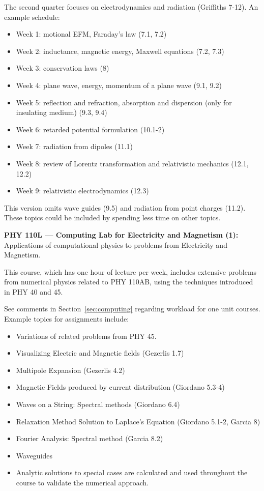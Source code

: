 \documentclass[12pt]{article}
\begin{document}
The second quarter focuses on electrodynamics and radiation (Griffiths 7-12).
An example schedule:
\begin{itemize}
\item Week 1: motional EFM, Faraday's law (7.1, 7.2)
\item Week 2: inductance, magnetic energy, Maxwell equations (7.2, 7.3)
\item Week 3: conservation laws (8)
\item Week 4: plane wave, energy, momentum of a plane wave (9.1, 9.2)
\item Week 5: reflection and refraction, absorption and dispersion (only for insulating medium) (9.3, 9.4)
\item Week 6: retarded potential formulation (10.1-2)
\item Week 7: radiation from dipoles (11.1)
\item Week 8: review of Lorentz transformation and relativistic mechanics (12.1, 12.2)
\item Week 9: relativistic electrodynamics (12.3)
\end{itemize}
This version omits wave guides (9.5) and radiation from point charges
(11.2).  These topics could be included by spending less time on other
topics.
\newpage

\vskip 1cm
\noindent
{\bf PHY 110L --- Computing Lab for Electricity and Magnetism (1):}
Applications of computational physics to problems from Electricity and
Magnetism.

This course, which has one hour of lecture per week, includes
extensive problems from numerical physics related to PHY 110AB, using
the techniques introduced in PHY 40 and 45.

See comments in Section~\ref{sec:computing} regarding workload for one
unit courses.  Example topics for assignments include:
\begin{itemize}
\item Variations of related problems from PHY 45.
\item Visualizing Electric and Magnetic fields (Gezerlis 1.7)
\item Multipole Expansion (Gezerlis 4.2)
\item Magnetic Fields produced by current distribution (Giordano 5.3-4)
\item Waves on a String: Spectral methods (Giordano 6.4)
\item Relaxation Method Solution to Laplace's Equation (Giordano 5.1-2, Garcia 8)
\item Fourier Analysis:  Spectral method (Garcia 8.2)
\item Waveguides
\item Analytic solutions to special cases are calculated and used throughout the
  course to validate the numerical approach.
\end{itemize}
\end{document}
